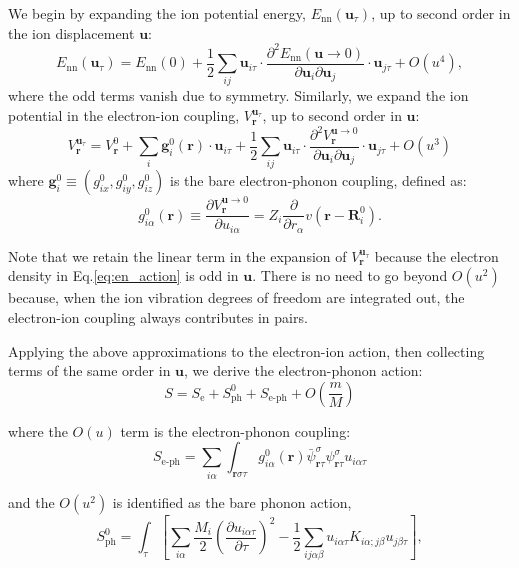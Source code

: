 \documentclass[%
 reprint,
superscriptaddress,
 amsmath,amssymb,
 aps,
prx,
]{revtex4-2}
\newcommand{\br}{\mathbf{r}}
\newcommand{\bR}{\mathbf{R}}
\newcommand{\bu}{\mathbf{u}}
\newcommand{\bg}{\mathbf{g}}
\newcommand{\txe}{\text{e}}
\newcommand{\txnn}{\text{nn}}
\newcommand{\txph}{\text{ph}}
\newcommand{\txeph}{\text{e-ph}}
\begin{document}
\begin{appendices}
We begin by expanding the ion potential energy, $E_{\txnn}(\bu_\tau)$, up to second order in the ion displacement $\bu$:
\begin{equation}
E_{\txnn}(\bu_\tau) = E_{\txnn}(0) +  \frac{1}{2}\sum_{ij}\bu_{i\tau} \cdot  \frac{\partial^2 E_{\txnn}(\bu\rightarrow 0)}{\partial{\bu_i}\partial{\bu_j}}   \cdot \bu_{j\tau}+O(u^4),
\end{equation}
where the odd terms vanish due to symmetry. Similarly, we expand the ion potential in the electron-ion coupling, $V^{\bu_\tau}_{\br}$, up to second order in $\bu$:
\begin{equation}
    V^{\bu_\tau}_{\br} =V^0_{ \br} +\sum_{i} \bg^0_{i}(\br) \cdot \bu_{i\tau} +   \frac{1}{2}\sum_{ij}\bu_{i\tau} \cdot \frac{\partial^2 V^{\bu\rightarrow 0}_{\br}}{\partial{\bu_i}\partial{\bu_j}} \cdot \bu_{j\tau}+O(u^3)
\end{equation}
where $\bg^0_{i} \equiv (g^0_{ix}, g^0_{iy}, g^0_{iz})$ is the bare electron-phonon coupling, defined as:
 \begin{equation}
   g^0_{i\alpha}\left( \br \right)\equiv  \frac{\partial V^{\bu\rightarrow 0}_\br}{\partial u_{i\alpha}}= Z_i\frac{\partial}{\partial r_\alpha}v( \br-\bR_i^0 ).
   \label{eq:epi_bare}
\end{equation}

Note that we retain the linear term in the expansion of $V^{\bu_\tau}_{\br}$ because the electron density in Eq.\eqref{eq:en_action} is odd in $\bu$. There is no need to go beyond $O(u^2)$ because, when the ion vibration degrees of freedom are integrated out, the electron-ion coupling always contributes in pairs.

Applying the above approximations to the electron-ion action, then collecting terms of the same order in $\bu$, we derive the electron-phonon action:
\begin{equation}
\label{eq:ep0_action}
    S = S_\txe + S^0_{\txph} +S_{\txeph} + O\left(\frac{m}{M}\right)
\end{equation}

where the $O(u)$ term is the electron-phonon coupling:
\begin{equation}
\label{eq:eph_action}
    S_{\txeph} = \sum_{i\alpha} \int_{\br\sigma\tau} g^0_{i\alpha}(\br) \bar{\psi}_{\br\tau}^{\sigma}\psi_{\br\tau}^{\sigma} u_{i\alpha\tau}
\end{equation}

and the $O(u^2)$ is identified as the bare phonon action,
\begin{equation}
    S_{\txph}^0 = \int_\tau \left[\sum_{i\alpha}\frac{M_i}{2}\left(\frac{\partial u_{i\alpha\tau}}{\partial\tau}\right)^2 - \frac{1}{2}\sum_{ij\alpha\beta} u_{i\alpha\tau} K_{i\alpha;j\beta} u_{j\beta\tau} \right],
\end{equation}


\end{appendices}
\end{document}
